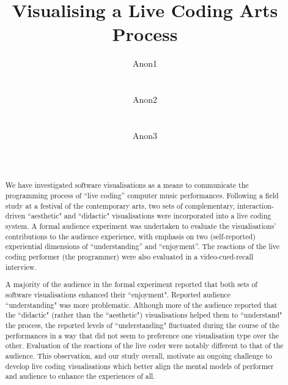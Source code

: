 \documentclass{sig-alternate}
\begin{document}

\title{Visualising a Live Coding Arts Process}

\author{
\alignauthor Anon1\\
       \affaddr{-}\\
       \affaddr{-}\\
       \email{-}
\alignauthor Anon2\\
       \affaddr{-}\\
       \affaddr{-}\\
       \email{-}
\alignauthor Anon3\\
       \affaddr{-}\\
       \affaddr{-}\\
       \email{-}
}

\maketitle
\begin{abstract}

We have investigated software visualisations as a means to communicate the programming process of ``live coding'' computer music performances. Following a field study at a festival of the contemporary arts, two sets of complementary, interaction-driven ``aesthetic" and ``didactic" visualisations were incorporated into a live coding system. A formal audience experiment was undertaken to evaluate the visualisations' contributions to the audience experience, with emphasis on two (self-reported) experiential dimensions of  ``understanding'' and ``enjoyment''. The reactions of the live coding performer (the programmer) were also evaluated in a video-cued-recall interview.

A majority of the audience in the formal experiment reported that both sets of software visualisations enhanced their ``enjoyment". Reported audience ``understanding" was more problematic. Although more of the audience reported that the ``didactic" (rather than the ``aesthetic") visualisations helped them to ``understand" the process, the reported levels of ``understanding" fluctuated during the course of the performances in a way that did not seem to preference one visualisation type over the other. Evaluation of the reactions of the live coder were notably different to that of the audience. This observation, and our study overall, motivate an ongoing challenge to develop live coding visualisations which better align the mental models of performer and audience to enhance the experiences of all.

\end{abstract}
\end{document}
